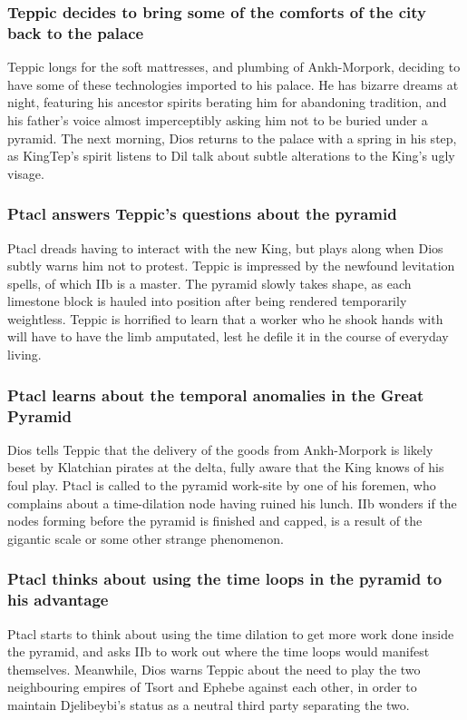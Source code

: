 \subsubsection{\Gls{Teppic} decides to bring some of the comforts of the city back to the palace}
\Gls{Teppic} longs for the soft mattresses, and plumbing of Ankh-Morpork, deciding to have some of
these technologies imported to his palace. He has bizarre dreams at night, featuring his ancestor
spirits berating him for abandoning tradition, and his father's voice almost imperceptibly asking
him not to be buried under a pyramid. The next morning, \Gls{Dios} returns to the palace with a
spring in his step, as \Gls{KingTep}'s spirit listens to \Gls{Dil} talk about subtle alterations to
the King's ugly visage.

\subsubsection{\Gls{Ptacl} answers \Gls{Teppic}'s questions about the pyramid}
\Gls{Ptacl} dreads having to interact with the new King, but plays along when \Gls{Dios} subtly
warns him not to protest. \Gls{Teppic} is impressed by the newfound levitation spells, of which
\Gls{IIb} is a master. The pyramid slowly takes shape, as each limestone block is hauled into
position after being rendered temporarily weightless. \Gls{Teppic} is horrified to learn that a
worker who he shook hands with will have to have the limb amputated, lest he defile it in the course
of everyday living.

\subsubsection{\Gls{Ptacl} learns about the temporal anomalies in the Great Pyramid}
\Gls{Dios} tells \Gls{Teppic} that the delivery of the goods from Ankh-Morpork is likely beset by
Klatchian pirates at the delta, fully aware that the King knows of his foul play. \Gls{Ptacl} is
called to the pyramid work-site by one of his foremen, who complains about a time-dilation node
having ruined his lunch. \Gls{IIb} wonders if the nodes forming before the pyramid is finished and
capped, is a result of the gigantic scale or some other strange phenomenon.

\subsubsection{\Gls{Ptacl} thinks about using the time loops in the pyramid to his advantage}
\Gls{Ptacl} starts to think about using the time dilation to get more work done inside the pyramid,
and asks \Gls{IIb} to work out where the time loops would manifest themselves. Meanwhile, \Gls{Dios}
warns \Gls{Teppic} about the need to play the two neighbouring empires of Tsort and Ephebe against
each other, in order to maintain Djelibeybi's status as a neutral third party separating the two.

